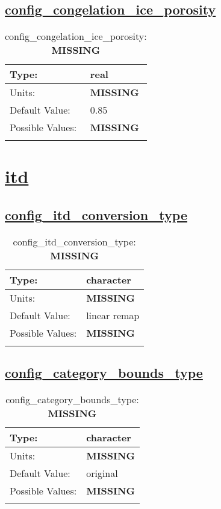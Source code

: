 \subsection[config\_congelation\_ice\_porosity]{\hyperref[sec:nm_tab_thermodynamics]{config\_congelation\_ice\_porosity}}
\label{subsec:nm_sec_config_congelation_ice_porosity}
\begin{center}
\begin{longtable}{| p{2.0in} || p{4.0in} |}
    \hline
    Type: & real \\
    \hline
    Units: & {\bf \color{red} MISSING} \\
    \hline
    Default Value: & 0.85 \\
    \hline
    Possible Values: & {\bf \color{red} MISSING} \\
    \hline
    \caption{config\_congelation\_ice\_porosity: {\bf \color{red} MISSING}}
\end{longtable}
\end{center}
\section[itd]{\hyperref[sec:nm_tab_itd]{itd}}
\label{sec:nm_sec_itd}
\subsection[config\_itd\_conversion\_type]{\hyperref[sec:nm_tab_itd]{config\_itd\_conversion\_type}}
\label{subsec:nm_sec_config_itd_conversion_type}
\begin{center}
\begin{longtable}{| p{2.0in} || p{4.0in} |}
    \hline
    Type: & character \\
    \hline
    Units: & {\bf \color{red} MISSING} \\
    \hline
    Default Value: & linear remap \\
    \hline
    Possible Values: & {\bf \color{red} MISSING} \\
    \hline
    \caption{config\_itd\_conversion\_type: {\bf \color{red} MISSING}}
\end{longtable}
\end{center}
\subsection[config\_category\_bounds\_type]{\hyperref[sec:nm_tab_itd]{config\_category\_bounds\_type}}
\label{subsec:nm_sec_config_category_bounds_type}
\begin{center}
\begin{longtable}{| p{2.0in} || p{4.0in} |}
    \hline
    Type: & character \\
    \hline
    Units: & {\bf \color{red} MISSING} \\
    \hline
    Default Value: & original \\
    \hline
    Possible Values: & {\bf \color{red} MISSING} \\
    \hline
    \caption{config\_category\_bounds\_type: {\bf \color{red} MISSING}}
\end{longtable}
\end{center}
